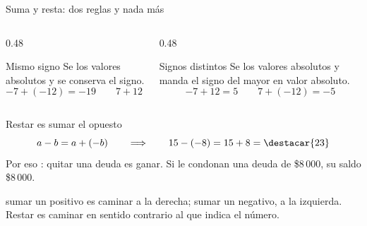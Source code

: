 \documentclass[aspectratio=169,10pt]{beamer}
\begin{document}
	
	\begin{frame}{Suma y resta: dos reglas y nada más}
		\scriptsize
		\begin{columns}[T,onlytextwidth]
			\begin{column}{0.48\textwidth}
				\begin{block}{Mismo signo}
					\tiny
					Se  los valores absolutos y se conserva el signo.
					\[ -7 + (-12) = -19 \qquad 7+12 = 19 \]
				\end{block}
			\end{column}
			\begin{column}{0.48\textwidth}
				\begin{block}{Signos distintos}
					\tiny
					Se  los valores absolutos y manda el signo del mayor en
					valor absoluto.
					\[ -7 + 12 = 5 \qquad 7 + (-12) = -5 \]
				\end{block}
			\end{column}
		\end{columns}
		
		\vspace{0.12cm}
		\begin{exampleblock}{Restar es sumar el opuesto}
			\tiny
			\[ a - b = a + (-b) \qquad\Longrightarrow\qquad
			15 - (-8) = 15 + 8 = \destacar{23} \]
			Por eso : quitar una deuda es
			ganar. Si le condonan una deuda de \$8\,000, su saldo 
			\$8\,000.
		\end{exampleblock}
		
		\vspace{0.06cm}
		{\tiny\color{uniGris}  sumar un positivo es
			caminar a la derecha; sumar un negativo, a la izquierda. Restar es caminar
			en sentido contrario al que indica el número.}
	\end{frame}
	
\end{document}
